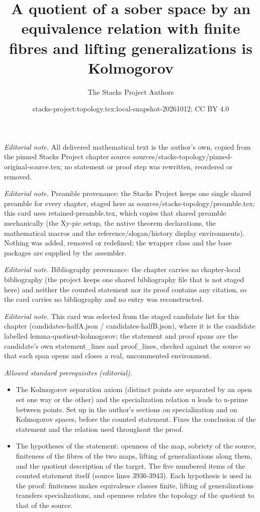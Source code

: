 \documentclass[10pt,a4paper]{amsart}
\title{A quotient of a sober space by an equivalence relation with finite fibres and lifting generalizations is Kolmogorov}
\author{The Stacks Project Authors}
\date{stacks-project:topology.tex:local-snapshot-20261012; CC BY 4.0}
\theoremstyle{plain}
\theoremstyle{definition}
\theoremstyle{remark}
\numberwithin{equation}{subsection}
\begin{document}
\maketitle
\noindent\textit{Editorial note.} All delivered mathematical text is the author's own, copied from the pinned Stacks Project chapter source sources/stacks-topology/pinned-original-source.tex; no statement or proof step was rewritten, reordered or removed.\par\medskip
\noindent\textit{Editorial note.} Preamble provenance: the Stacks Project keeps one single shared preamble for every chapter, staged here as sources/stacks-topology/preamble.tex; this card uses retained-preamble.tex, which copies that shared preamble mechanically (the Xy-pic setup, the native theorem declarations, the mathematical macros and the reference/slogan/history display environments). Nothing was added, removed or redefined; the wrapper class and the base packages are supplied by the assembler.\par\medskip
\noindent\textit{Editorial note.} Bibliography provenance: the chapter carries no chapter-local bibliography (the project keeps one shared bibliography file that is not staged here) and neither the counted statement nor its proof contains any citation, so the card carries no bibliography and no entry was reconstructed.\par\medskip
\noindent\textit{Editorial note.} This card was selected from the staged candidate list for this chapter (candidates-halfA.json / candidates-halfB.json), where it is the candidate labelled lemma-quotient-kolmogorov; the statement and proof spans are the candidate's own statement\_lines and proof\_lines, checked against the source so that each span opens and closes a real, uncommented environment.\par\medskip
\noindent\textit{Allowed standard prerequisites (editorial).}\begin{itemize}
\item The Kolmogorov separation axiom (distinct points are separated by an open set one way or the other) and the specialization relation u leads to u-prime between points. Set up in the author's sections on specialization and on Kolmogorov spaces, before the counted statement. Fixes the conclusion of the statement and the relation used throughout the proof.
\item The hypotheses of the statement: openness of the map, sobriety of the source, finiteness of the fibres of the two maps, lifting of generalizations along them, and the quotient description of the target. The five numbered items of the counted statement itself (source lines 3936-3943). Each hypothesis is used in the proof: finiteness makes equivalence classes finite, lifting of generalizations transfers specializations, and openness relates the topology of the quotient to that of the source.
\end{itemize}\medskip
\end{document}
